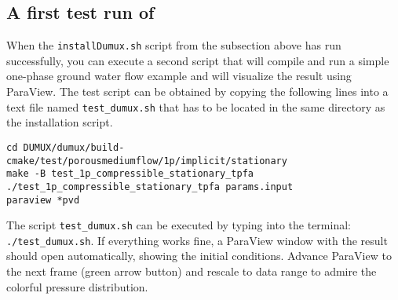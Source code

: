 \subsection{A first test run of \Dumux}
When the \texttt{installDumux.sh} script from the subsection above has run successfully, you can execute a second script that
will compile and run a simple one-phase ground water flow example and will visualize the result using ParaView.
The test script can be obtained by copying the following lines into a text file named \texttt{test\_dumux.sh}
that has to be located in the same directory as the installation script.
\begin{lstlisting}[style=DumuxCode]
cd DUMUX/dumux/build-cmake/test/porousmediumflow/1p/implicit/stationary
make -B test_1p_compressible_stationary_tpfa
./test_1p_compressible_stationary_tpfa params.input
paraview *pvd
\end{lstlisting}
The script \texttt{test\_dumux.sh} can be executed by typing into the terminal: \texttt{./test\_dumux.sh}.
If everything works fine, a ParaView window with the result should open automatically, showing the initial
conditions. Advance ParaView to the next frame (green arrow button) and rescale to data range to admire
the colorful pressure distribution.

